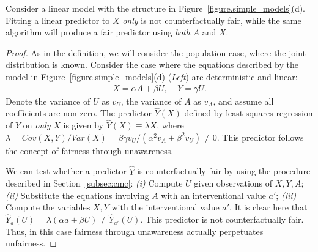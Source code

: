 \begin{lem}
Consider a linear model with the structure in
Figure~\ref{figure.simple_models}(d).  Fitting a linear predictor to
$X$ \emph{only} is not counterfactually fair, while the same algorithm
will produce a fair predictor using \emph{both} $A$ and $X$.
\end{lem}
%
\begin{proof}
As in the definition, we will consider the population case, where the
joint distribution is known. Consider the case where the equations
described by the model in Figure~\ref{figure.simple_models}(d)
(\emph{Left}) are deterministic and linear:
\begin{align}
X = \alpha A + \beta U, \;\;\;\; Y = \gamma U. \nonumber
\end{align}
Denote the variance of $U$ as $v_U$, the variance of $A$ as $v_A$, and
assume all coefficients are non-zero. The predictor $\hat Y(X)$
defined by least-squares regression of $Y$ on \emph{only} $X$ is given
by $\hat Y(X) \equiv \lambda X$, where $\lambda = Cov(X, Y) / Var(X)
\!=\! \beta\gamma v_U / (\alpha^2 v_A + \beta^2 v_U) \neq 0$. This 
predictor follows the concept of fairness through unawareness.

We can test whether a predictor $\hat{Y}$ is counterfactually fair
by using the procedure described in Section~\ref{subsec:cmc}:
{\em (i)} Compute $U$ given observations of $X,Y,A$; %
{\em (ii)} Substitute the equations involving $A$ with an interventional value $a'$; 
{\em (iii)} Compute the variables $X,Y$ with the interventional value
$a'$. It is clear here that $\hat Y_a(U) \!=\! \lambda(\alpha a +
\beta U) \neq \hat Y_{a'}(U)$. This predictor is not counterfactually
fair. Thus, in this case fairness through unawareness actually
perpetuates unfairness.


\end{proof}
